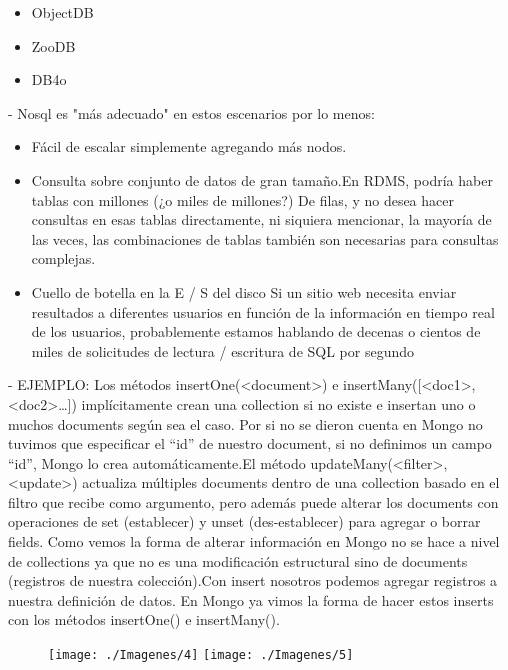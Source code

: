 \documentclass[%
 reprint,
 amsmath,amssymb,
 aps,
]{revtex4-1}
\begin{document}
           \begin{itemize}
		\item ObjectDB
		\item ZooDB
		\item DB4o
	\end{itemize}

- Nosql es "más adecuado" en estos escenarios por lo menos:
   \begin{itemize}
		\item Fácil de escalar simplemente agregando más nodos.
		\item Consulta sobre conjunto de datos de gran tamaño.En RDMS, podría haber tablas con millones (¿o miles de millones?) De filas, y no desea hacer consultas en esas tablas directamente, ni siquiera mencionar, la mayoría de las veces, las combinaciones de tablas también son necesarias para consultas complejas.
		\item Cuello de botella en la E / S del disco Si un sitio web necesita enviar resultados a diferentes usuarios en función de la información en tiempo real de los usuarios, probablemente estamos hablando de decenas o cientos de miles de solicitudes de lectura / escritura de SQL por segundo\cite{No}
	\end{itemize}
- EJEMPLO:
Los métodos insertOne(<document>) e insertMany([<doc1>,<doc2>…]) implícitamente crean una collection si no existe e insertan uno o muchos documents según sea el caso. Por si no se dieron cuenta en Mongo no tuvimos que especificar el “id” de nuestro document, si no definimos un campo “id”, Mongo lo crea automáticamente.El método updateMany(<filter>,<update>) actualiza múltiples documents dentro de una collection basado en el filtro que recibe como argumento, pero además puede alterar los documents con operaciones de set (establecer) y unset (des-establecer) para agregar o borrar fields. Como vemos la forma de alterar información en Mongo no se hace a nivel de collections ya que no es una modificación estructural sino de documents (registros de nuestra colección).Con insert nosotros podemos agregar registros a nuestra definición de datos. En Mongo ya vimos la forma de hacer estos inserts con los métodos insertOne() e insertMany().\cite{NoSQL}
\begin{figure}[htb]
	\begin{center}
	\texttt{[image: ./Imagenes/4]}
          \texttt{[image: ./Imagenes/5]}
	\end{center}
	\end{figure}
\end{document}
